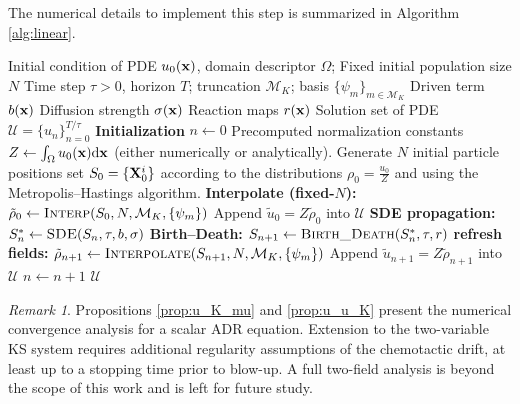\documentclass[a4paper,fleqn]{cas-sc}
\theoremstyle{definition}
\theoremstyle{remark}
\newtheorem{remark}[theorem]{Remark}
\begin{document}
The numerical details to implement this step is summarized in Algorithm \ref{alg:linear}.

\begin{algorithm}
    \caption{Stochastic Branching for linear scalar reaction--diffusion--advection equation} \label{alg:linear}
    \begin{algorithmic}
        \Require Initial condition of PDE $u_0(\mathbf{x})$, domain descriptor $\Omega$;
        \Require Fixed initial population size $N$
        \Require Time step $\tau>0$, horizon $T$; truncation $\mathcal M_K$; basis $\{\psi_m\}_{m\in\mathcal M_K}$
        \Require Driven term $b(\mathbf{x})$
        \Require Diffusion strength $\sigma(\mathbf{x})$
        \Require Reaction maps $r(\mathbf{x})$
        \Ensure  Solution set of PDE $\mathcal U = \{u_n\}_{n=0}^{T/\tau}$
        \State \textbf{Initialization}
        \State $n\gets 0$
        \State Precomputed normalization constants  $Z\gets \int_\Omega u_0(\mathbf{x})\mathrm{d} \mathbf{x}$  (either numerically or analytically).
        \State Generate $N$ initial particle positions set $S_0=\{\mathbf{X}^i_0\}$ according to the distributions $\rho_0=\frac{u_0}{Z}$ and using the Metropolis--Hastings algorithm.
        \State \textbf{Interpolate (fixed-$N$):}
        \State $\tilde\rho_0 \gets \textsc{Interp}(S_0,N,\mathcal M_K,\{\psi_m\})$
        \State Append $\tilde u_0 = Z\tilde \rho_0$ into $\mathcal U$
            \State \textbf{SDE propagation:}
            \State $S_n^*\gets \textsc{SDE}(S_n,\tau,b,\sigma)$
            \State \textbf{Birth--Death:}
            \State $S_{n+1}\gets \textsc{Birth\_Death}(S_{n}^*,\tau,r)$
            \State \textbf{refresh fields:}
            \State $\tilde\rho_{n+1} \gets \textsc{Interpolate}(S_{n+1},N,\mathcal M_K,\{\psi_m\})$
            \State Append $\tilde u_{n+1} = Z\tilde \rho_{n+1}$ into $\mathcal U$
            \State $n\gets n+1$
        \EndWhile
        \State \Return $\mathcal U$
        \EndProcedure
    \end{algorithmic}
\end{algorithm}

\begin{remark}
Propositions \ref{prop:u_K_mu} and \ref{prop:u_u_K} present the numerical convergence analysis for a scalar ADR equation. Extension to the two-variable KS system requires additional regularity assumptions of  the chemotactic drift, at least up to a stopping time prior to blow-up. A full two-field analysis is beyond the scope of this work and is left for future study.    
\end{remark}
\end{document}
